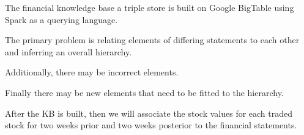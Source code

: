 \cite{Punnoose2012-kt}
The financial knowledge base a triple store is built on Google BigTable using Spark as a querying language.

The primary problem is relating elements of differing statements to each other and inferring an overall hierarchy.

Additionally, there may be incorrect elements.

Finally there may be new elements that need to be fitted to the hierarchy.

After the KB is built, then we will associate the stock values for each traded stock for two weeks prior and two weeks posterior to the financial statements.